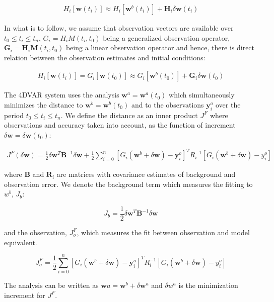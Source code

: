 \documentclass[a4,12pt]{article}
\numberwithin{equation}{section}
\begin{document}
\begin{align}
H_{i}[\mathbf {w}(t_{i})] \approx H_{i}[\mathbf {w}^{b}(t_{i})]+\mathbf {H}_{i}\delta \mathbf {w}(t_{i})
\end{align}

In what is to follow, we assume that observation vectors are available over $t_{0}\leq t_{i} \leq t_{n}$, $G_{i} = H_{i}M(t_{i},t_{0})$ being a generalized observation operator, $\mathbf {G}_{i} = \mathbf {H}_{i}\mathbf {M}(t_{i},t_{0})$ being a linear observation operator and hence, there is direct relation between the observation estimates and initial conditions:

\begin{align}
H_{i}[\mathbf {w}(t_{i})]=G_{i}[\mathbf {w}(t_{0})] \approx G_{i}[\mathbf {w}^{b}(t_{0})] + \mathbf {G}_{i}\delta \mathbf {w}(t_{0})
\end{align}

The 4DVAR system uses the analysis $\mathbf {w}^{a}=\mathbf {w}^{a}(t_{0})$ which simultaneously minimizes the distance to $\mathbf {w}^{b} = \mathbf {w}^{b}(t_{0})$ and to the observations $\mathbf {y}_{i}^{o}$ over the period $t_{0}\leq t_{i} \leq t_{n}$. We define the distance as an inner product $J^{F}$ where observations and accuracy taken into account, as the function of increment $\delta \mathbf {w} = \delta \mathbf {w}(t_{0})$:

\begin{align}
J^{F}(\delta \mathbf {w}) = \frac{1}{2} \delta \mathbf {w}^{T} \mathbf {B}^{-1} \delta \mathbf {w} + \frac{1}{2} \sum_{i=0}^{n}[G_{i}(\mathbf {w}^{b}+\delta \mathbf {w})-\mathbf {y}_{i}^{o}]^{T}R_{i}^{-1}[G_{i}(\mathbf {w}^{b} + \delta \mathbf {w}) - y_{i}^{o}]
\end{align}

where $\mathbf {B}$ and $\mathbf {R}_{i}$ are matrices with covariance estimates of background and observation error. We denote the background term which measures the fitting to $w^{b}$, $J_{b}$:

$$J_{b}=\frac{1}{2} \delta \mathbf {w}^{T} \mathbf {B}^{-1} \delta \mathbf {w}$$ 

and  the observation, $J_{o}^{F}$, which measures the fit between observation and model equivalent. 

$$J_{o}^{F}=\frac{1}{2} \sum_{i=0}^{n}[G_{i}(\mathbf {w}^{b}+\delta \mathbf {w})-\mathbf {y}_{i}^{o}]^{T}R_{i}^{-1}[G_{i}(\mathbf {w}^{b} + \delta \mathbf {w}) - y_{i}^{o}]$$

The analysis can be written as $\mathbf {w}{a} = \mathbf {w}^{b}+\delta \mathbf {w}^{a}$ and $\delta w^{a}$ is the minimization increment for $J^{F}$.
\end{document}
